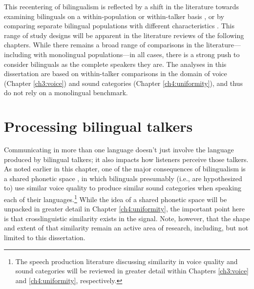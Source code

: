 This recentering of bilingualism is reflected by a shift in the literature towards examining bilinguals on a within-population \citep[e.g.,][]{chan_2020_lexically} or within-talker basis \citep[e.g.,][]{simonet_2019_convergence}, or by comparing separate bilingual populations with different characteristics \citep[e.g.,][]{brown_2009_phonological}. This range of study designs will be apparent in the literature reviews of the following chapters. While there remains a broad range of comparisons in the literature---including with monolingual populations---in all cases, there is a strong push to consider bilinguals as the complete speakers they are. The analyses in this dissertation are based on within-talker comparisons in the domain of voice (Chapter \ref{ch3:voice}) and sound categories (Chapter \ref{ch4:uniformity}), and thus do not rely on a monolingual benchmark.

\section{Processing bilingual talkers}\label{ch1:sec:processing}

Communicating in more than one language doesn't just involve the language produced by bilingual talkers; it also impacts how listeners perceive those talkers. As noted earlier in this chapter, one of the major consequences of bilingualism is a shared phonetic space \citep{flege_2021_slmr}, in which bilinguals presumably (i.e., are hypothesized to) use similar voice quality to produce similar sound categories when speaking each of their languages.\footnote{The speech production literature discussing similarity in voice quality and sound categories will be reviewed in greater detail within Chapters \ref{ch3:voice} and \ref{ch4:uniformity}, respectively.} While the idea of a shared phonetic space will be unpacked in greater detail in Chapter \ref{ch4:uniformity}, the important point here is that crosslinguistic similarity exists in the signal. Note, however, that the shape and extent of that similarity remain an active area of research, including, but not limited to this dissertation.

